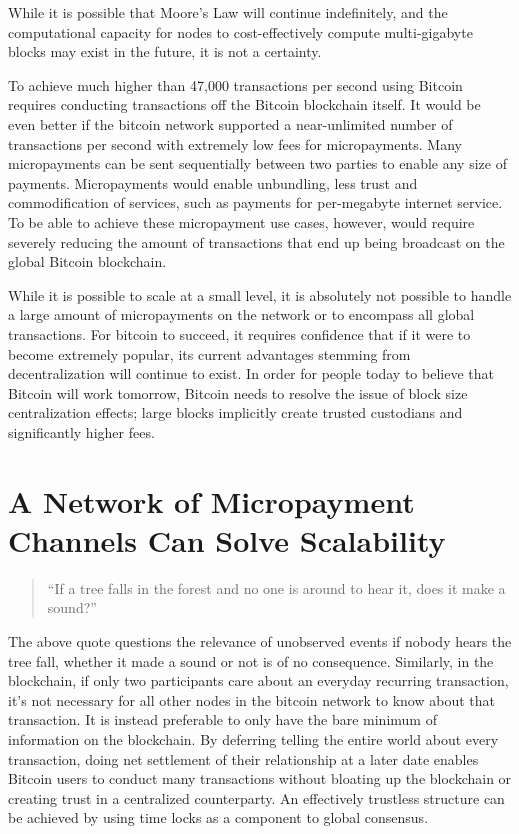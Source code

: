 \documentclass[letterpaper,11pt]{article}
\begin{document}
While it is possible that Moore's Law will continue indefinitely, and the
computational capacity for nodes to cost-effectively compute multi-gigabyte
blocks may exist in the future, it is not a certainty.

To achieve much higher than 47,000 transactions per second using Bitcoin
requires conducting transactions off the Bitcoin blockchain itself. It would be
even better if the bitcoin network supported a near-unlimited number of
transactions per second with extremely low fees for micropayments. Many
micropayments can be sent sequentially between two parties to enable any size
of payments. Micropayments would enable unbundling, less trust and
commodification of services, such as payments for per-megabyte internet
service. To be able to achieve these micropayment use cases, however, would
require severely reducing the amount of transactions that end up being
broadcast on the global Bitcoin blockchain.

While it is possible to scale at a small level, it is absolutely not possible to
handle a large amount of micropayments on the network or to encompass all
global transactions. For bitcoin to succeed, it requires confidence that if it
were to become extremely popular, its current advantages stemming from
decentralization will continue to exist. In order for people today to believe
that Bitcoin will work tomorrow, Bitcoin needs to resolve the issue of block
size centralization effects; large blocks implicitly create trusted custodians
and significantly higher fees.

\section{A Network of Micropayment Channels Can Solve Scalability}

\begin{quote}
	``If a tree falls in the forest and no one is around to hear it, does
	it make a sound?''
\end{quote}

The above quote questions the relevance of unobserved events \textemdash if
nobody hears the tree fall, whether it made a sound or not is of no
consequence. Similarly, in the blockchain, if only two participants care about
an everyday recurring transaction, it's not necessary for all other nodes in
the bitcoin network to know about that transaction. It is instead preferable to
only have the bare minimum of information on the blockchain. By deferring
telling the entire world about every transaction, doing net settlement of their
relationship at a later date enables Bitcoin users to conduct many transactions
without bloating up the blockchain or creating trust in a centralized
counterparty. An effectively trustless structure can be achieved by using time
locks as a component to global consensus. 
\end{document}
